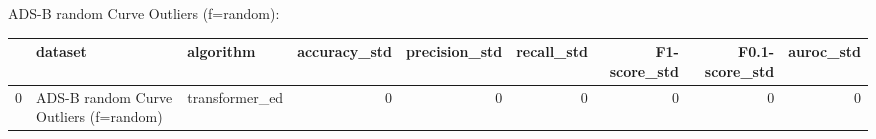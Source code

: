 ADS-B random Curve Outliers (f=random):

\begin{tabular}{rllrrrrrr}
\hline
    & dataset                                & algorithm      &   accuracy\_std &   precision\_std &   recall\_std &   F1-score\_std &   F0.1-score\_std &   auroc\_std \\
\hline
  0 & ADS-B random Curve Outliers (f=random) & transformer\_ed &              0 &               0 &            0 &              0 &                0 &           0 \\
\hline
\end{tabular}

